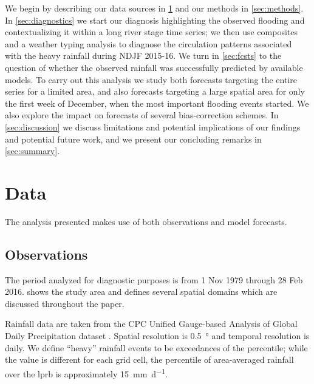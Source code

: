 \documentclass[twocol]{ametsoc}
\begin{document}
We begin by describing our data sources in \cref{sec:data} and our methods in \cref{sec:methods}.
In \cref{sec:diagnostics} we start our diagnosis highlighting the observed flooding and contextualizing it within a long river stage time series; we then use composites and a weather typing analysis to diagnose the circulation patterns associated with the heavy rainfall during NDJF 2015-16.
We turn in \cref{sec:fcsts} to the question of whether the observed rainfall was successfully predicted by available models.
To carry out this analysis we study both forecasts targeting the entire series for a limited area, and also forecasts targeting a large spatial area for only the first week of December, when the most important flooding events started.
We also explore the impact on forecasts of several bias-correction schemes.
In \cref{sec:discussion} we discuss limitations and potential implications of our findings and potential future work, and we present our concluding remarks in \cref{sec:summary}.


\section{Data} \label{sec:data}

The analysis presented makes use of both observations and model forecasts.

\subsection{Observations}

The period analyzed for diagnostic purposes is from 1 Nov 1979 through 28 Feb 2016.
 shows the study area and defines several spatial domains which are discussed throughout the paper.

Rainfall data are taken from the CPC Unified Gauge-based Analysis of Global Daily Precipitation dataset \citep{Chen2008}.
Spatial resolution is \SI{0.5}{\degree} and temporal resolution is daily.
We define ``heavy'' rainfall events to be exceedances of the  percentile; while the value is different for each grid cell, the  percentile of area-averaged rainfall over the \gls{lprb} is approximately \SI{15}{\milli\meter\per\day}.
\end{document}
